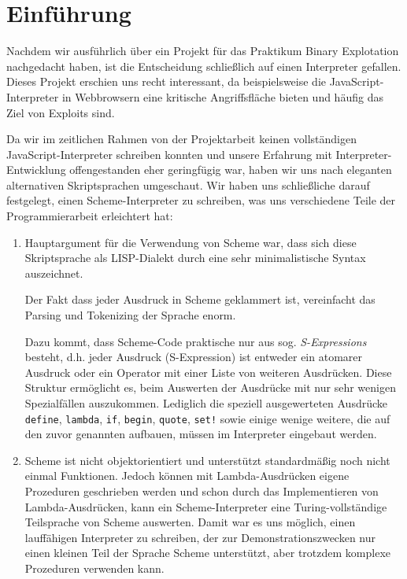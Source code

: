 \section[Einführung]{Einführung}
Nachdem wir ausführlich über ein Projekt für das Praktikum Binary Explotation
nachgedacht haben, ist die Entscheidung schließlich auf einen Interpreter
gefallen. Dieses Projekt erschien uns recht interessant, da beispielsweise
die JavaScript-Interpreter in Webbrowsern eine kritische Angriffsfläche bieten
und häufig das Ziel von Exploits sind.
\par
Da wir im zeitlichen Rahmen von der Projektarbeit keinen vollständigen
JavaScript-Interpreter schreiben konnten und unsere Erfahrung mit
Interpreter-Entwicklung offengestanden eher geringfügig war, haben wir uns
nach eleganten alternativen Skriptsprachen umgeschaut.
Wir haben uns schließliche darauf festgelegt, einen Scheme-Interpreter zu
schreiben, was uns verschiedene Teile der Programmierarbeit erleichtert hat:
\begin{enumerate}
  \item Hauptargument für die Verwendung von Scheme war, dass sich diese
    Skriptsprache als LISP-Dialekt durch eine sehr minimalistische Syntax
    auszeichnet.
    
    Der Fakt dass jeder Ausdruck in Scheme geklammert ist, vereinfacht das
    Parsing und Tokenizing der Sprache enorm.
    \par
    Dazu kommt, dass Scheme-Code praktische nur aus
    sog. \emph{S-Expressions} besteht, d.h.
    jeder Ausdruck (S-Expression) ist entweder ein atomarer Ausdruck oder
    ein Operator mit einer Liste von weiteren Ausdrücken. Diese Struktur
    ermöglicht es, beim Auswerten der Ausdrücke mit nur sehr wenigen Spezialfällen auszukommen.
    Lediglich die speziell ausgewerteten Ausdrücke \texttt{define},
    \texttt{lambda}, \texttt{if}, \texttt{begin}, \texttt{quote}, \texttt{set!}
    sowie einige wenige weitere, die auf den zuvor genannten aufbauen, müssen
    im Interpreter eingebaut werden.
  \item Scheme ist nicht objektorientiert und unterstützt standardmäßig noch
    nicht einmal Funktionen. Jedoch können mit Lambda-Ausdrücken eigene 
    Prozeduren geschrieben werden und schon durch das Implementieren
    von Lambda-Ausdrücken, kann ein Scheme-Interpreter eine Turing-vollständige
    Teilsprache von Scheme auswerten. Damit war es uns möglich, einen lauffähigen
    Interpreter zu schreiben, der zur Demonstrationszwecken nur einen kleinen
    Teil der Sprache Scheme unterstützt, aber trotzdem komplexe Prozeduren
    verwenden kann.
\end{enumerate}
